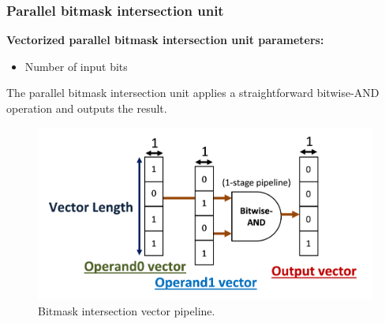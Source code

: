 \subsubsection{Parallel bitmask intersection unit}

\textbf{Vectorized parallel bitmask intersection unit parameters:}

\begin{itemize}
    \item Number of input bits
\end{itemize}

The parallel bitmask intersection unit applies a straightforward bitwise-AND operation and outputs the result.

\begin{figure}[H]
    \centering
    \includegraphics[width=\linewidth]{figures/bitmask_intersection.png}
    \caption{Bitmask intersection vector pipeline.}
    \label{fig:bitmask_intersection}
\end{figure}